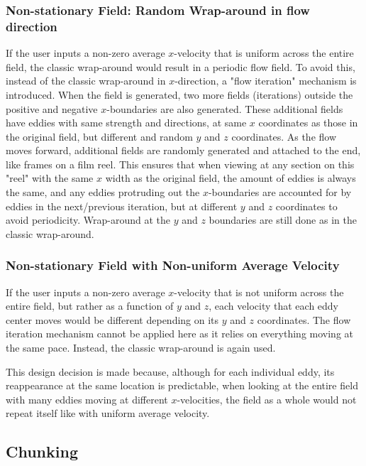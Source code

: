 \documentclass[12pt, titlepage]{article}
\begin{document}
\subsubsection{Non-stationary Field: Random Wrap-around in flow direction}
If the user inputs a non-zero average $x$-velocity that is uniform across the entire field, the classic wrap-around would result in a periodic flow field. To avoid this, instead of the classic wrap-around in $x$-direction, a "flow iteration" mechanism is introduced. When the field is generated, two more fields (iterations) outside the positive and negative $x$-boundaries are also generated. These additional fields have eddies with same strength and directions, at same $x$ coordinates as those in the original field, but different and random $y$ and $z$ coordinates. As the flow moves forward, additional fields are randomly generated and attached to the end, like frames on a film reel. This ensures that when viewing at any section on this "reel" with the same $x$ width as the original field, the amount of eddies is always the same, and any eddies protruding out the $x$-boundaries are accounted for by eddies in the next/previous iteration, but at different $y$ and $z$ coordinates to avoid periodicity. Wrap-around at the $y$ and $z$ boundaries are still done as in the classic wrap-around.

\subsubsection{Non-stationary Field with Non-uniform Average Velocity}
If the user inputs a non-zero average $x$-velocity that is not uniform across the entire field, but rather as a function of $y$ and $z$, each velocity that each eddy center moves would be different depending on its $y$ and $z$ coordinates. The flow iteration mechanism cannot be applied here as it relies on everything moving at the same pace. Instead, the classic wrap-around is again used.

This design decision is made because, although for each individual eddy, its reappearance at the same location is predictable, when looking at the entire field with many eddies moving at different $x$-velocities, the field as a whole would not repeat itself like with uniform average velocity.

\subsection{Chunking}
\end{document}
